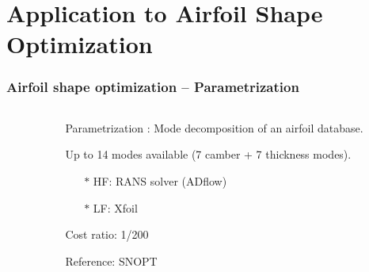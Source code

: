 \documentclass{beamer}
\theoremstyle{remark}
\theoremstyle{plain}
\begin{document}
\section{Application to Airfoil Shape Optimization}
\label{sec:partie2}
\begin{frame}[fragile]
  \frametitle{Airfoil shape optimization -- Parametrization}
  \begin{columns}
  \begin{column}{0.6\textwidth}
  \end{column}
  \begin{column}{0.4\linewidth}
  \scriptsize
  Parametrization \cite{Jichao}:
  Mode decomposition of an airfoil database.
  
  Up to 14 modes available (7 camber + 7 thickness modes).
  
  \begin{itemize}
  \item[$\ast$] HF: RANS solver (ADflow)
  \item[$\ast$] LF: Xfoil \cite{drela1989xfoil}
  \end{itemize}
  Cost ratio: 1/200
  
  Reference: SNOPT \cite{gill2005snopt}
  \end{column}
  \end{columns}
\end{frame}
\end{document}
